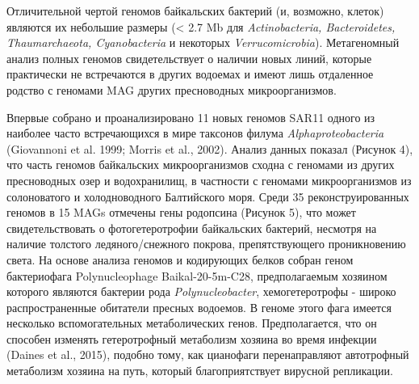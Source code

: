 \documentclass[a4paper,12pt,openany,final]{extreport}
\begin{document}
Отличительной чертой геномов байкальских бактерий (и, возможно, клеток)
являются их небольшие размеры (\textless{} 2.7 Mb для
\emph{Actinobacteria, Bacteroidetes, Thaumarchaeota, Cyanobacteria} и
некоторых \emph{Verrucomicrobia}). Метагеномный анализ полных геномов
свидетельствует о наличии новых линий, которые практически не
встречаются в других водоемах и имеют лишь отдаленное родство с геномами
MAG других пресноводных микроорганизмов.

Впервые собрано и проанализировано 11 новых геномов SAR11 одного из
наиболее часто встречающихся в мире таксонов филума
\emph{Alphaproteobacteria} (Giovannoni et al. 1999; Morris et al.,
2002). Анализ данных показал (Рисунок 4), что часть геномов байкальских
микроорганизмов сходна с геномами из других пресноводных озер и
водохранилищ, в частности с геномами микроорганизмов из солоноватого и
холодноводного Балтийского моря. Среди 35 реконструированных геномов в
15 MAGs отмечены гены родопсина (Рисунок 5), что может свидетельствовать
о фотогетеротрофии байкальских бактерий, несмотря на наличие толстого
ледяного/снежного покрова, препятствующего проникновению света. На
основе анализа геномов и кодирующих белков собран геном бактериофага
Polynucleophage Baikal-20-5m-C28, предполагаемым хозяином которого
являются бактерии рода \emph{Polynucleobacter}, хемогетеротрофы - широко
распространенные обитатели пресных водоемов. В геноме этого фага имеется
несколько вспомогательных метаболических генов. Предполагается, что он
способен изменять гетеротрофный метаболизм хозяина во время инфекции
(Daines et al., 2015), подобно тому, как цианофаги перенаправляют
автотрофный метаболизм хозяина на путь, который благоприятствует
вирусной репликации.
\end{document}
